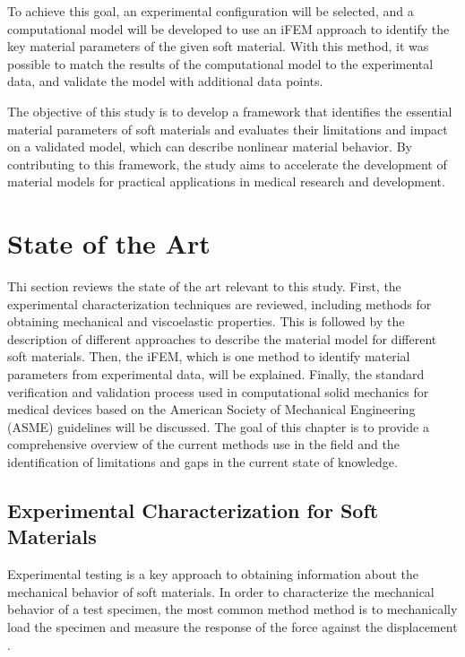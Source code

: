 To achieve this goal, an experimental configuration will be selected, and a computational model will be 
developed to use an iFEM approach to identify the key material parameters of the given soft material. 
With this method, it was possible to match the results of the computational model to the experimental 
data, and validate the model with additional data points. 

The objective of this study is to develop a framework that identifies the essential material parameters of soft materials 
and evaluates their limitations and impact on a validated model, which can describe nonlinear material behavior.
By contributing to this framework, the study aims to accelerate the development of material models for practical 
applications in medical research and development.
\section{State of the Art}

Thi section reviews the state of the art relevant to this study. First, the experimental characterization 
techniques are reviewed, including methods for obtaining mechanical and viscoelastic properties.
This is followed by the description of different approaches to describe the material model for different soft 
materials. Then, the iFEM, which is one method to identify material parameters from experimental data, 
will be explained. Finally, the standard verification and validation process used in computational 
solid mechanics for medical devices based on the American Society of Mechanical Engineering (ASME) guidelines 
will be discussed. The goal of this chapter is to provide a comprehensive overview of the current methods use in 
the field and the identification of limitations and gaps in the current state of knowledge. %

\subsection{Experimental Characterization for Soft Materials}
\label{subsection:experimentalcharacterization}
Experimental testing is a key approach to obtaining information about the mechanical behavior of soft materials.
In order to characterize the mechanical behavior of a test specimen, the most common method
method is to mechanically load the specimen and measure the response of the force against 
the displacement \cite{Bergström2015}. \\


